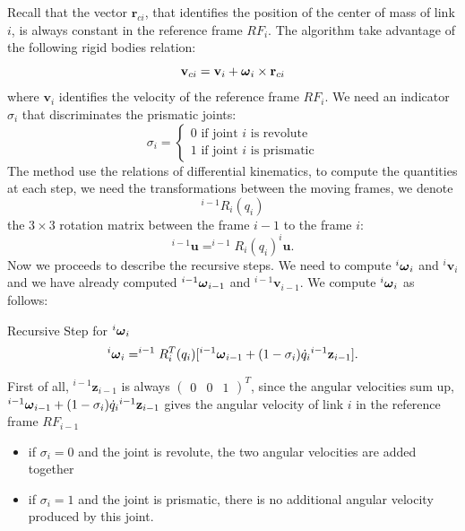 \documentclass[10pt, a4paper]{report}
\begin{document}
Recall that the vector $\mathbf r_{ci}$, that identifies the position of the center of mass of link $i$, is always constant in the reference frame $RF_i$. The algorithm take advantage of the following rigid bodies relation:\begin{equation}\label{vel_rigid_bodies}
    \mathbf v_{ci}=\mathbf v_i+{\boldsymbol{\omega}}_i\times\mathbf r_{ci}
\end{equation}
where $\mathbf v_i$ identifies the velocity of the reference frame $RF_i$. We need an indicator $\sigma_i$ that discriminates the prismatic joints:\begin{equation}
    \sigma_i=\begin{cases}
        0\text{ if joint $i$ is revolute}\\
        1\text{ if joint $i$ is prismatic}
    \end{cases}
\end{equation}
The method use the relations of differential kinematics, to compute the quantities at each step, we need the transformations between the moving frames, we denote $$^{i-1}R_i(q_i) $$
the $3\times 3$ rotation matrix between the frame $i-1$ to the frame $i$:\begin{equation}
    ^{i-1}\mathbf u= ^{i-1}R_i(q_i)  ^{i}\mathbf u.
\end{equation}
Now we proceeds to describe the recursive steps. We need to compute ${}^i{\boldsymbol{\omega}}_i$ and ${}^i\mathbf v_{i}$ and we have already computed ${}^{i-1}{\boldsymbol{\omega}}_{i-1}$ and ${}^{i-1}\mathbf v_{i-1}$. We compute ${}^i{\boldsymbol{\omega}}_i$ as follows:
\begin{boxequation*}{Recursive Step for $ {}^i{\boldsymbol{\omega}}_i$}{}
\begin{equation}\label{bomega_i}
    {}^i{\boldsymbol{\omega}}_i=^{i-1}R^T_i(q_i)[{}^{i-1}{\boldsymbol{\omega}}_{i-1}+(1-\sigma_i)\dot q_i {}^{i-1}\mathbf z_{i-1}].
\end{equation}
\end{boxequation*}
First of all, ${}^{i-1}\mathbf z_{i-1}$ is always $\begin{pmatrix}
    0&0&1
\end{pmatrix}^T$, since the angular velocities sum up, ${}^{i-1}{\boldsymbol{\omega}}_{i-1}+(1-\sigma_i)\dot q_i {}^{i-1}\mathbf z_{i-1}$ gives the angular velocity of link $i$  in the reference frame $RF_{i-1}$\begin{itemize}
    \item if $\sigma_i=0$ and the joint is revolute, the two angular velocities are added together 
    \item if $\sigma_i=1$ and the joint is prismatic, there is no additional angular velocity produced by this joint.
\end{itemize}
\end{document}
